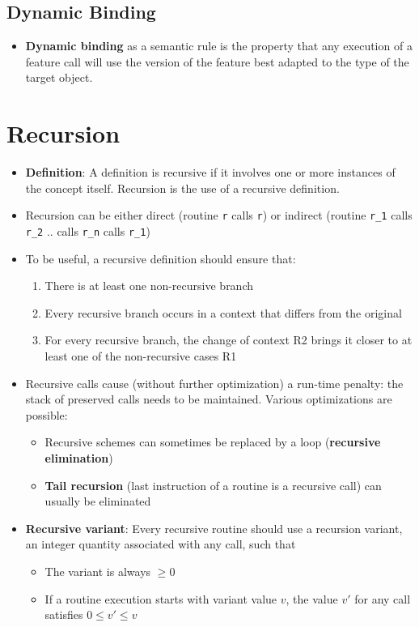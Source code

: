 \documentclass[a4paper]{article}
\newcommand{\inline}[1]{\lstinline!#1!}%
\begin{document}
\subsection{Dynamic Binding}
\begin{itemize}
\item \textbf{Dynamic binding} as a semantic rule is the property that any execution of a feature call will use the version of the feature best adapted to the type of the target object.
\end{itemize}

\section{Recursion}
\begin{itemize}
\item \textbf{Definition}: A definition is recursive if it involves one or more instances of the concept itself. Recursion is the use of a recursive definition. 
\item Recursion can be either direct (routine \inline{r} calls \inline{r}) or indirect (routine \inline{r_1} calls \inline{r_2} .. calls \inline{r_n} calls \inline{r_1})
\item To be useful, a recursive definition should ensure that:
\begin{enumerate}[R1:]
\item There is at least one non-recursive branch
\item Every recursive branch occurs in a context that differs from the original
\item For every recursive branch, the change of context R2 brings it closer to at least one of the non-recursive cases R1
\end{enumerate}
\item Recursive calls cause (without further optimization) a run-time penalty: the stack of preserved calls needs to be maintained. Various optimizations are possible:
\begin{itemize}
\item Recursive schemes can sometimes be replaced by a loop (\textbf{recursive elimination})
\item \textbf{Tail recursion} (last instruction of a routine is a recursive call) can usually be eliminated 
\end{itemize}
\item \textbf{Recursive variant}: Every recursive routine should use a recursion variant, an integer quantity associated with any call, such that
\begin{itemize}
\item The variant is always $\geq 0$
\item If a routine execution starts with variant value $v$, the value $v'$ for any call satisfies $0\leq v'\leq v$
\end{itemize}
\end{itemize}
\end{document}
